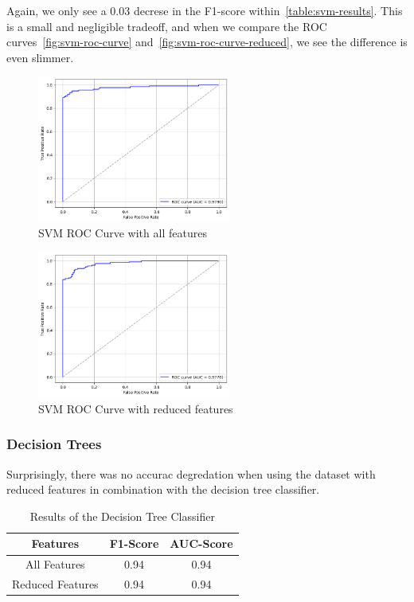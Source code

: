 \documentclass[conference]{IEEEtran}
\begin{document}
Again, we only see a 0.03 decrese in the F1-score within~\autoref{table:svm-results}. This is a small and negligible tradeoff, and when we compare the ROC curves~\autoref{fig:svm-roc-curve} and~\autoref{fig:svm-roc-curve-reduced}, we see the difference is even slimmer.

\begin{figure}[h]
	\begin{center}
		\includegraphics[width=2.5in]{svm-roc-curve}
		\caption{SVM ROC Curve with all features}\label{fig:svm-roc-curve}
	\end{center}
\end{figure}

\begin{figure}[h]
	\begin{center}
		\includegraphics[width=2.5in]{svm-roc-curve-reduced}
		\caption{SVM ROC Curve with reduced features}\label{fig:svm-roc-curve-reduced}
	\end{center}
\end{figure}

\subsubsection{Decision Trees}

Surprisingly, there was no accurac degredation when using the dataset with reduced features in combination with the decision tree classifier.

\begin{table}[h!]
	\begin{center}
		\begin{tabular}{| c | c c |}
			\hline
			Features         & F1-Score & AUC-Score \\ [0.5ex]
			\hline
			All Features     & 0.94     & 0.94      \\
			Reduced Features & 0.94     & 0.94      \\[1ex]
			\hline
		\end{tabular}
	\end{center}
	\caption{Results of the Decision Tree Classifier}
	\label{table:dt-results}
\end{table}
\end{document}
